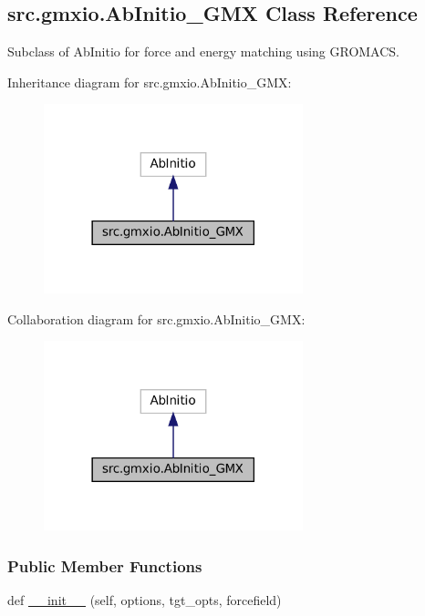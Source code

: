 \hypertarget{classsrc_1_1gmxio_1_1AbInitio__GMX}{}\subsection{src.\+gmxio.\+Ab\+Initio\+\_\+\+G\+MX Class Reference}
\label{classsrc_1_1gmxio_1_1AbInitio__GMX}


Subclass of Ab\+Initio for force and energy matching using G\+R\+O\+M\+A\+CS.  




Inheritance diagram for src.\+gmxio.\+Ab\+Initio\+\_\+\+G\+MX\+:
\nopagebreak
\begin{figure}[H]
\begin{center}
\leavevmode
\includegraphics[width=213pt]{classsrc_1_1gmxio_1_1AbInitio__GMX__inherit__graph}
\end{center}
\end{figure}


Collaboration diagram for src.\+gmxio.\+Ab\+Initio\+\_\+\+G\+MX\+:
\nopagebreak
\begin{figure}[H]
\begin{center}
\leavevmode
\includegraphics[width=213pt]{classsrc_1_1gmxio_1_1AbInitio__GMX__coll__graph}
\end{center}
\end{figure}
\subsubsection*{Public Member Functions}
\begin{DoxyCompactItemize}
\item 
def \hyperlink{classsrc_1_1gmxio_1_1AbInitio__GMX_ac2e952e1bcc52afc4c07aa7c7a7c7692}{\+\_\+\+\_\+init\+\_\+\+\_\+} (self, options, tgt\+\_\+opts, forcefield)
\end{DoxyCompactItemize}
